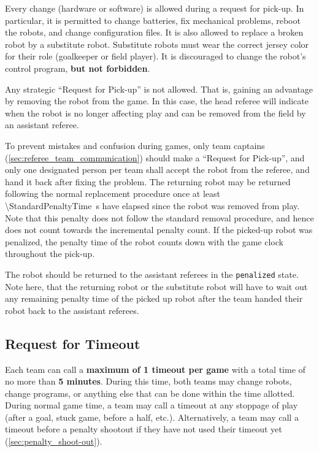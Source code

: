 Every change (hardware or software) is allowed during a request for pick-up.
In particular, it is permitted to change batteries, fix mechanical problems, reboot the robots, and change configuration files.
It is also allowed to replace a broken robot by a substitute robot.
Substitute robots must wear the correct jersey color for their role (goalkeeper or field player).
It is discouraged to change the robot's control program, \textbf{but not forbidden}.

Any strategic ``Request for Pick-up'' is not allowed.
That is, gaining an advantage by removing the robot from the game.
In this case, the head referee will indicate when the robot is no longer affecting play and can be removed from the field by an assistant referee.

To prevent mistakes and confusion during games, only team captains (\cf \cref{sec:referee_team_communication}) should make a ``Request for Pick-up'', and only one designated person per team shall accept the robot from the referee, and hand it back after fixing the problem.
The returning robot may be returned following the normal replacement procedure once at least \qty{\StandardPenaltyTime}{\second} have elapsed since the robot was removed from play.
Note that this penalty does not follow the standard removal procedure, and hence does not count towards the incremental penalty count.
If the picked-up robot was penalized, the penalty time of the robot counts down with the game clock throughout the pick-up.

The robot should be returned to the assistant referees in the \texttt{penalized} state.
Note here, that the returning robot or the substitute robot will have to wait out any remaining penalty time of the picked up robot after the team handed their robot back to the assistant referees.

\subsection{Request for Timeout}
\label{sec:request_for_timeout}

Each team can call a \textbf{maximum of 1 timeout per game} with a total time of no more than \textbf{5 minutes}.
During this time, both teams may change robots, change programs, or anything else that can be done within the time allotted.
During normal game time, a team may call a timeout at any stoppage of play (after a goal, stuck game, before a half, etc.).
Alternatively, a team may call a timeout before a penalty shootout if they have not used their timeout yet (\cf \cref{sec:penalty_shoot-out}).

